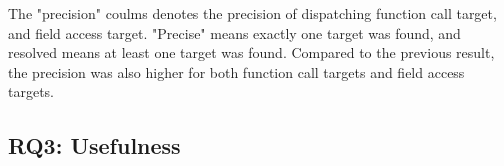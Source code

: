 The "precision" coulms denotes the precision of dispatching function call target, and field access target.
"Precise" means exactly one target was found, and resolved means at least one target was found.
Compared to the previous result, the precision was also higher for both function call targets and field access targets.

\subsection{RQ3: Usefulness}

